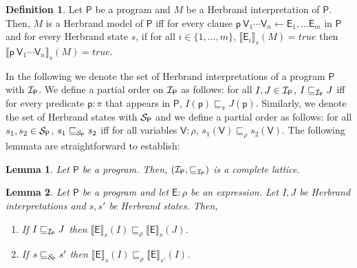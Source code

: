 \documentclass[submission,copyright]{eptcs}
\newtheorem{lemma}{Lemma}
\theoremstyle{definition}
\newtheorem{definition}{Definition}
\newcommand{\mwrs}[3]{\llbracket#1\rrbracket_{#3}(#2)}
\newcommand{\aleq}[1][]{\sqsubseteq_{#1}}
\begin{document}
\begin{definition}
Let $\mathsf{P}$ be a program and $M$ be a Herbrand interpretation of $\mathsf{P}$.
Then, $M$ is a Herbrand model of $\mathsf{P}$ iff for every clause
$\mathsf{p}\ \mathsf{V}_1\cdots\mathsf{V}_n \leftarrow \mathsf{E}_1, \ldots \mathsf{E}_m$ in $\mathsf{P}$
and for every Herbrand state $s$, if for all $i \in \{1,\ldots,m\}$, $\mwrs{\mathsf{E}_i}{M}{s} = \mathit{true}$ then
$\mwrs{\mathsf{p}\ \mathsf{V}_1\cdots\mathsf{V}_n}{M}{s} = \mathit{true}$.
\end{definition}
In the following we denote the set of Herbrand interpretations of a program $\mathsf{P}$
with ${\cal I}_\mathsf{P}$. We define a partial order on ${\cal I}_\mathsf{P}$ as
follows: for all $I, J \in {\cal I}_\mathsf{P}$, $I \aleq[{\cal I}_\mathsf{P}] J$
iff for every predicate $\mathsf{p} : \pi$ that appears in $\mathsf{P}$, $I(\mathsf{p}) \aleq[\pi] J(\mathsf{p})$.
Similarly, we denote the set of Herbrand states with ${\cal S}_\mathsf{P}$ and we define
a partial order as follows: for all $s_1, s_2 \in {\cal S}_\mathsf{P}$, $s_1 \aleq[{\cal S}_\mathsf{P}] s_2$ iff
for all variables $\mathsf{V} : \rho$, $s_1(\mathsf{V}) \aleq[\rho] s_2(\mathsf{V})$.
The following lemmata are straightforward to establish:
\begin{lemma}
Let $\mathsf{P}$ be a program. Then, $({\cal I}_\mathsf{P},\aleq[{\cal I}_\mathsf{P}])$ is a complete lattice.
\end{lemma}

\begin{lemma} \label{interp-state-monotonicity}
Let $\mathsf{P}$ be a program and let $\mathsf{E} : \rho$ be an expression.
Let $I, J$ be Herbrand interpretations and $s, s'$ be Herbrand states.
Then,
\begin{enumerate}
  \item If $I \aleq[{\cal I}_\mathsf{P}] J$  then $\mwrs{\mathsf{E}}{I}{s} \aleq[\rho] \mwrs{\mathsf{E}}{J}{s}$.
  \item If $s \aleq[{\cal S}_\mathsf{P}] s'$ then $\mwrs{\mathsf{E}}{I}{s} \aleq[\rho] \mwrs{\mathsf{E}}{I}{s'}$.
\end{enumerate}
\end{lemma}
\end{document}
